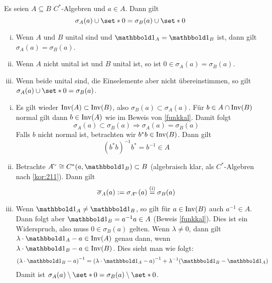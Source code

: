 \begin{korollar}[label=korr:220,{name=[Spektrum in C*-Unteralgebren]}]
	Es seien $A \subseteq B$  $C^*$-Algebren und $a \in A$. Dann gilt
	\[
		\sigma_A(a) \cup \set*{0} = \sigma_B(a) \cup \set*{0}
	\]
	\begin{enumerate}[(i),itemsep=0pt]
		\item Wenn $A$ und $B$ unital sind und $\ind_A=\ind_B$ ist, dann gilt $\sigma_A(a) = \sigma_B(a)$.
		\item Wenn $A$ nicht unital ist und $B$ unital ist, so ist $0 \in \sigma_A(a) = \sigma_B(a)$. 
		\item Wenn beide unital sind, die Einselemente aber nicht übereinstimmen, so gilt $\sigma_A(a) \cup \set*{0} = \sigma_B(a)$.
	\end{enumerate}
\end{korollar}
\begin{beweis} \leavevmode
	\begin{enumerate}[(i)]
		\item Es gilt wieder $\operatorname{Inv}(A) \subset \operatorname{Inv}(B)$, also $\sigma_B(a) \subset \sigma_A(a)$.
		Für $b \in A \cap \operatorname{Inv}(B)$ normal gilt dann $b \in \operatorname{Inv}(A)$ wie im Beweis von \autoref{funkkal}. Damit folgt
		\[
			\sigma_A(a) \subset \sigma_B(a) \Longrightarrow \sigma_A(a) = \sigma_B(a)
		\]
		Falls $b$ nicht normal ist, betrachten wir $b^*b \in \operatorname{Inv}(B)$. Dann gilt
		\[
			(b^*b)^{-1} b^* = b^{-1} \in A
		\]
		\item Betrachte $A^\simm \cong C^*(a,\ind_B) \subset B$ (algebraisch klar, als $C^*$-Algebren nach \autoref{kor:211}). Dann gilt
		\[
			\overline{\sigma}_A(a) := \sigma_{A^\simm}(a) \StackText{(i)}{=}\sigma_B(a)
		\]
		\item Wenn $\ind_A \neq \ind_B$, so gilt für $a \in \operatorname{Inv}(B)$ auch $a^{-1}\in A$. 
		Dann folgt aber $\ind_B = a^{-1}a\in A$ (Beweis \ref{funkkal}). 
		Dies ist ein Widerspruch, also muss $0 \in \sigma_B(a)$ gelten. 
		Wenn $\lambda \neq 0$, dann gilt $\lambda \cdot \ind_A - a \in \Inv(A)$ genau dann, wenn $\lambda \cdot \ind_B -a \in \Inv(B)$. 
		Dies sieht man wie folgt:
		\begin{align}
			\enbrace*{\lambda \cdot \ind_B- a}^{-1} = \enbrace*{\lambda \cdot \ind_A -a}^{-1} + \lambda^{-1}\enbrace*{\ind_B-\ind_A}
		\end{align}
		Damit ist $\sigma_A(a) \setminus \set*{0} = \sigma_B(a) \setminus \set*{0}$. \qedhere
	\end{enumerate}
\end{beweis}
\newpage

